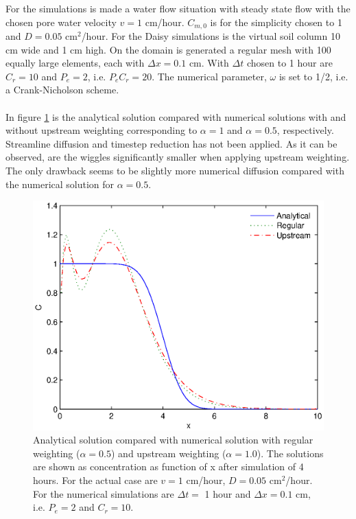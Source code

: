 \documentclass{report}
\begin{document}
For the simulations is made a water flow situation with steady state
flow with the chosen pore water velocity $v=1$ cm/hour.
$C_{m,0}$ is for the simplicity chosen to 1 and $D=0.05$
cm$^2$/hour. For the Daisy simulations is the virtual soil column
10 cm wide and 1 cm high. On the domain is generated a regular
mesh with 100 equally large elements, each with $\Delta x=0.1$
cm. With $\Delta t$ chosen to 1 hour are $C_r=10$ and $P_e=2$,
i.e. $P_eC_r=20$. The numerical parameter, $\omega$ is set to
1/2, i.e. a
Crank-Nicholson scheme.\\
\\
In figure \ref{fig:Stab_Upstream} is the analytical solution
compared with numerical solutions with and without upstream
weighting corresponding to $\alpha=1$ and $\alpha=0.5$,
respectively. Streamline diffusion and timestep reduction has not
been applied. As it can be observed, are the wiggles significantly
smaller when applying upstream weighting. The only drawback
seems to be slightly more numerical diffusion compared with the
numerical solution for $\alpha=0.5$.

\begin{figure}[htbp]  %
\includegraphics[width=\hsize]{Stab_Upstream.eps}
\caption{Analytical solution compared with numerical solution with regular weighting ($\alpha=0.5$)
and upstream weighting ($\alpha=1.0$). The solutions are shown as concentration as function of x after
simulation of 4 hours. For the actual case are $v=1$ cm/hour, $D=0.05$ cm$^2$/hour. For the numerical
simulations are $\Delta t=$ 1 hour and $\Delta x = 0.1$ cm, i.e. $P_e=2$ and $C_r=10$.}
\label{fig:Stab_Upstream}
\end{figure}
\end{document}
